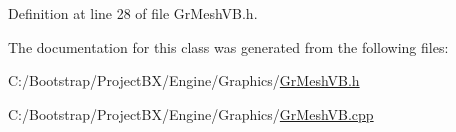Definition at line 28 of file GrMeshVB.h.

The documentation for this class was generated from the following files:\begin{CompactItemize}
\item 
C:/Bootstrap/ProjectBX/Engine/Graphics/\hyperlink{_gr_mesh_v_b_8h}{GrMeshVB.h}\item 
C:/Bootstrap/ProjectBX/Engine/Graphics/\hyperlink{_gr_mesh_v_b_8cpp}{GrMeshVB.cpp}\end{CompactItemize}
